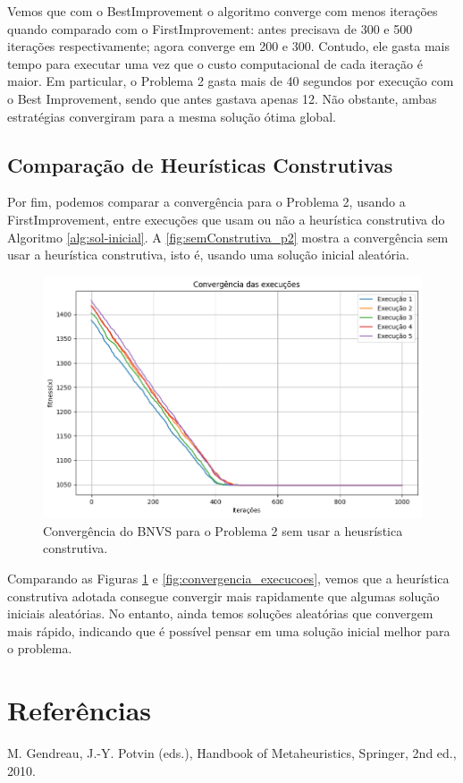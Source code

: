 \documentclass[
	12pt,				%
	oneside,			%
	a4paper,			%
	chapter=TITLE,
	sumario=tradicional,
	english,			%
	brazil				%
]{abntex2}
\begin{document}
Vemos que com o BestImprovement o algoritmo converge com menos iterações quando comparado com o FirstImprovement:
antes precisava de 300 e 500 iterações respectivamente; agora converge em 200 e 300.
Contudo,
ele gasta mais tempo para executar uma vez que o custo computacional de cada iteração é maior.
Em particular, o Problema 2 gasta mais de 40 segundos por execução com o Best Improvement, sendo que antes gastava
apenas 12.
Não obstante, ambas estratégias convergiram para a mesma solução ótima global.

\section{Comparação de Heurísticas Construtivas}

Por fim, podemos comparar a convergência para o Problema 2, usando a FirstImprovement, entre execuções
que usam ou não a heurística construtiva do Algoritmo \ref{alg:sol-inicial}. A \autoref{fig:semConstrutiva_p2} mostra 
a convergência sem usar a heurística construtiva, isto é, usando uma solução inicial aleatória.

\begin{figure}[h!]
	\caption{\label{fig:semConstrutiva_p2}Convergência do BNVS para o Problema 2 sem usar a heusrística construtiva.}
	\begin{center}
    \includegraphics[width=\textwidth,trim=1 1 1 1,clip]{semConstrutiva_p2.png}
	\end{center}
\end{figure}

Comparando as Figuras \ref{fig:semConstrutiva_p2} e \ref{fig:convergencia_execucoes}, vemos que a heurística construtiva 
adotada consegue convergir mais rapidamente que algumas solução iniciais aleatórias. No entanto, ainda temos soluções aleatórias 
que convergem mais rápido, indicando que é possível pensar em uma solução inicial melhor para o problema.

\chapter{Referências}\label{cap:referencias} 

\noindent M. Gendreau, J.-Y. Potvin (eds.), Handbook of Metaheuristics, Springer, 2nd ed., 2010.
\end{document}
